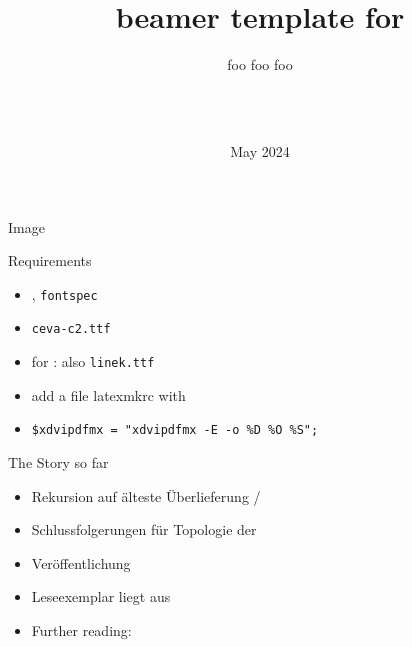 \documentclass[t,dvipsnames]{beamer}
\title{beamer template for \ceva{c-base}}
\subtitle{foo foo foo}
\author{\ceva{c-base cience ring}\\\ceva{\&}\\\ceva{penta - ms. cience}}%
\date{May 2024}
\begin{document}
\frame{\titlepage}

\begin{frame}{Image}
    \resizebox{!}{0.8\textheight}{}
\end{frame}

\begin{frame}{Requirements}
    \begin{itemize}
        \item \XeLaTeX, \texttt{fontspec}
        \item \texttt{ceva-c2.ttf}
        \item for : also \texttt{linek.ttf}
        \item add a file latexmkrc with
        \item[]  \texttt{\$xdvipdfmx = "xdvipdfmx -E -o \%D \%O \%S";}
    \end{itemize}
\end{frame}

\begin{frame}{The Story so far}
\end{frame}

\begin{frame}{}
    \begin{itemize}
        \item Rekursion auf älteste Überlieferung / 
        \item Schlussfolgerungen für Topologie der 
        \item Veröffentlichung  \cite{penta2024}
        \item Leseexemplar liegt aus
        \item Further reading: \cite{adams1981restaurant}
    \end{itemize}
\end{frame}

\begin{frame}{}

    
    
    
    
\end{frame}
\end{document}
